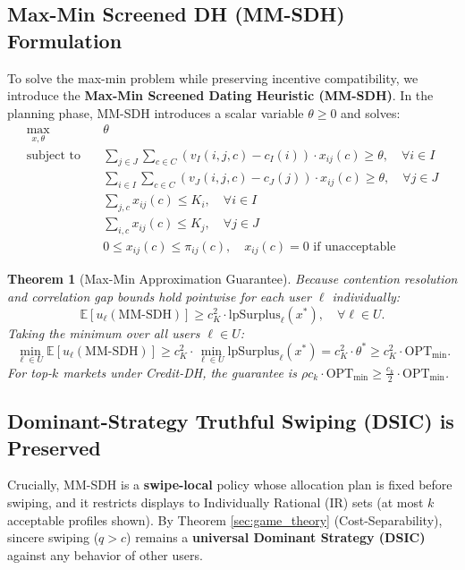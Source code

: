 \documentclass[11pt,letterpaper]{article}
\theoremstyle{definition}
\theoremstyle{plain}
\newtheorem{theorem}{Theorem}[section]
\theoremstyle{remark}
\begin{document}
\subsection{Max-Min Screened DH (MM-SDH) Formulation}
To solve the max-min problem while preserving incentive compatibility, we introduce the \textbf{Max-Min Screened Dating Heuristic (MM-SDH)}. In the planning phase, MM-SDH introduces a scalar variable $\theta \ge 0$ and solves:
\begin{align}
    \max_{x, \theta} \quad & \theta \\
    \text{subject to} \quad & \sum_{j \in J} \sum_{c \in C} (v_I(i, j, c) - c_I(i)) \cdot x_{ij}(c) \ge \theta, \quad \forall i \in I \tag{Initiator Floor} \\
    & \sum_{i \in I} \sum_{c \in C} (v_J(i, j, c) - c_J(j)) \cdot x_{ij}(c) \ge \theta, \quad \forall j \in J \tag{Responder Floor} \\
    & \sum_{j, c} x_{ij}(c) \le K_i, \quad \forall i \in I \tag{Initiator Capacity} \\
    & \sum_{i, c} x_{ij}(c) \le K_j, \quad \forall j \in J \tag{Responder Capacity} \\
    & 0 \le x_{ij}(c) \le \pi_{ij}(c), \quad x_{ij}(c) = 0 \text{ if unacceptable} \tag{Feasibility}
\end{align}

\begin{theorem}[Max-Min Approximation Guarantee]
Because contention resolution and correlation gap bounds hold pointwise for each user $\ell$ individually:
\begin{equation}
    \mathbb{E}[u_\ell(\text{MM-SDH})] \ge c_K^2 \cdot \mathrm{lpSurplus}_\ell(x^*), \quad \forall \ell \in U.
\end{equation}
Taking the minimum over all users $\ell \in U$:
\begin{equation}
    \min_{\ell \in U} \mathbb{E}[u_\ell(\text{MM-SDH})] \ge c_K^2 \cdot \min_{\ell \in U} \mathrm{lpSurplus}_\ell(x^*) = c_K^2 \cdot \theta^* \ge c_K^2 \cdot \mathrm{OPT}_{\min}.
\end{equation}
For top-$k$ markets under Credit-DH, the guarantee is $\rho c_k \cdot \mathrm{OPT}_{\min} \ge \frac{c_k}{2} \cdot \mathrm{OPT}_{\min}$.
\end{theorem}

\subsection{Dominant-Strategy Truthful Swiping (DSIC) is Preserved}
Crucially, MM-SDH is a \textbf{swipe-local} policy whose allocation plan is fixed before swiping, and it restricts displays to Individually Rational (IR) sets (at most $k$ acceptable profiles shown). 
By Theorem \ref{sec:game_theory} (Cost-Separability), sincere swiping ($q > c$) remains a \textbf{universal Dominant Strategy (DSIC)} against any behavior of other users.
\end{document}
